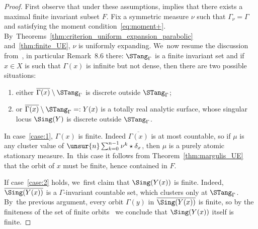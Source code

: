 \begin{proof}
First observe that under these assumptions, \cite[Th.\,C]{finite_orbits} implies
that there exists a maximal finite invariant subset $F$.
Fix a symmetric measure $\nu$ such that $\Gamma_\nu = \Gamma$ and satisfying the
moment condition~\eqref{eq:moment+}. By~Theorems~\ref{thm:criterion_uniform_expansion_parabolic} and~\ref{thm:finite_UE},
$\nu$ is uniformly expanding. We~now resume the discussion from~\cite[\S 8]{invariant}, in particular Remark~8.6 there: $\STang_\Gamma$ is a finite invariant set and if $x\in X$ is such that $\Gamma(x)$ is infinite
but not dense, then there are two possible situations:
\begin{enumerate}
\item\label{case:1} either $\overline{\Gamma(x)}\setminus \STang_\Gamma$ is discrete outside $\STang_\Gamma$;
\item\label{case:2} or $\overline{\Gamma(x)}\setminus \STang_\Gamma =: Y(x)$ is a totally real analytic surface, whose singular locus $\Sing(Y)$ is discrete outside $\STang_\Gamma$.
\end{enumerate}

In case~\eqref{case:1}, $\Gamma(x)$ is finite.
Indeed $\overline {\Gamma(x)}$ is at most countable,
so if $\mu$ is any cluster value of
$\unsur{n}\sum_{k=0}^{n-1} \nu^k\star\delta_x$, then $\mu$ is a purely atomic
stationary measure. In~this case it follows from Theorem~\ref{thm:margulis_UE} that
the orbit of $x$ must be finite, hence contained in $F$.

If case~\eqref{case:2} holds, we~first claim that $\Sing(Y(x))$ is finite.
Indeed, $\overline {\Sing(Y(x))}$ is a $\Gamma$-invariant countable set, which clusters only at
$\STang_\Gamma$. By~the previous argument, every orbit $\Gamma(y)$ in $\overline {\Sing(Y(x))}$ is finite, so by the
finiteness of the set of finite orbits~\cite[Th.\,C]{finite_orbits} we conclude that
$\Sing(Y(x))$ itself is finite.


\end{proof}
